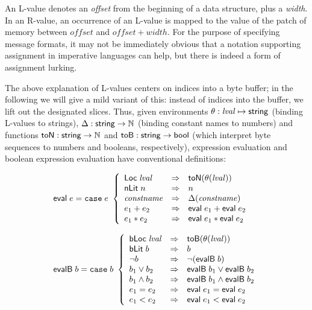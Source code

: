 An L-value denotes an \emph{offset} from the beginning of a
data structure, plus a \emph{width}. In an R-value, an occurrence of an
L-value is mapped to the value of the patch of memory between
$\mathit{offset}$ and $\mathit{offset} + \mathit{width}$. For the
purpose of specifying message formats, it may not be immediately
obvious that a notation supporting assignment in imperative languages
can help, but there is indeed a form of assignment lurking.

The above explanation of L-values centers on indices into a byte
buffer; in the following we will give a mild variant of this: instead
of indices into the buffer, we lift out the designated slices. Thus,
given environments $\theta: \mathit{lval} \mapsto \mathsf{string}$ (binding
L-values to strings), $\Delta : \mathsf{string} \to \mathbb{N}$
(binding constant names to numbers) and functions
$\mathsf{toN}:\mathsf{string}\to\mathbb{N}$ and
$\mathsf{toB}:\mathsf{string}\to\mathsf{bool}$ (which interpret byte
sequences to numbers and booleans, respectively), expression
evaluation and boolean expression evaluation have conventional
definitions:

\[
\begin{array}{l}
\mathsf{eval} \; e =
\mathtt{case}\; e\
 \left\{
 \begin{array}{lcl}
    \mathsf{Loc}\; \mathit{lval} & \Rightarrow & \mathsf{toN}(\theta(\mathit{lval})) \\
    \mathsf{nLit}\; n & \Rightarrow & n  \\
    \mathit{constname} & \Rightarrow & \Delta(\mathit{constname})  \\
    e_1 + e_2 & \Rightarrow & \mathsf{eval}\; e_1 + \mathsf{eval}\; e_2  \\
    e_1 * e_2 & \Rightarrow & \mathsf{eval}\; e_1 * \mathsf{eval}\; e_2  \\
  \end{array}
 \right.
 \\ \\
\mathsf{evalB} \; b =
\mathtt{case}\; b\
 \left\{
 \begin{array}{lcl}
    \mathsf{bLoc}\; \mathit{lval} & \Rightarrow & \mathsf{toB}(\theta(\mathit{lval})) \\
    \mathsf{bLit}\; b & \Rightarrow & b \\
    \neg b & \Rightarrow & \neg(\mathsf{evalB} \; b)  \\
    b_1 \lor b_2 & \Rightarrow & \mathsf{evalB} \;b_1 \lor \mathsf{evalB} \;b_2   \\
    b_1 \land b_2 & \Rightarrow & \mathsf{evalB} \;b_1 \land \mathsf{evalB} \;b_2   \\
    e_1 = e_2 & \Rightarrow & \mathsf{eval} \;e_1 = \mathsf{eval} \;e_2   \\
    e_1 < e_2 & \Rightarrow & \mathsf{eval} \;e_1 < \mathsf{eval} \;e_2
  \end{array}
 \right.

\end{array}
\]

